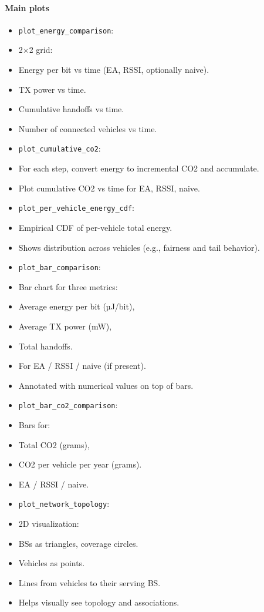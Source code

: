 \documentclass[conference]{IEEEtran}
\begin{document}
\paragraph*{Main plots}
\begin{itemize}
\item \texttt{plot\_energy\_comparison}:
\item 2×2 grid:
\item Energy per bit vs time (EA, RSSI, optionally naive).
\item TX power vs time.
\item Cumulative handoffs vs time.
\item Number of connected vehicles vs time.
\item \texttt{plot\_cumulative\_co2}:
\item For each step, convert energy to incremental CO2 and accumulate.
\item Plot cumulative CO2 vs time for EA, RSSI, naive.
\item \texttt{plot\_per\_vehicle\_energy\_cdf}:
\item Empirical CDF of per-vehicle total energy.
\item Shows distribution across vehicles (e.g., fairness and tail behavior).
\item \texttt{plot\_bar\_comparison}:
\item Bar chart for three metrics:
\item Average energy per bit (µJ/bit),
\item Average TX power (mW),
\item Total handoffs.
\item For EA / RSSI / naive (if present).
\item Annotated with numerical values on top of bars.
\item \texttt{plot\_bar\_co2\_comparison}:
\item Bars for:
\item Total CO2 (grams),
\item CO2 per vehicle per year (grams).
\item EA / RSSI / naive.
\item \texttt{plot\_network\_topology}:
\item 2D visualization:
\item BSs as triangles, coverage circles.
\item Vehicles as points.
\item Lines from vehicles to their serving BS.
\item Helps visually see topology and associations.

\end{itemize}
\end{document}

